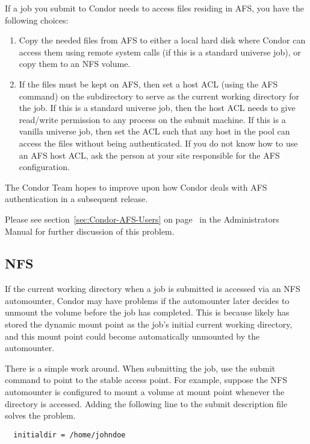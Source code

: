 If a job you submit to Condor needs to access files residing in AFS,
you have the following choices:
\begin{enumerate}
\item Copy the needed files from AFS to either a local hard disk where 
Condor can access them using remote system calls (if
this is a standard universe job), or copy them to an NFS volume.
\item If the files must be kept on AFS, then set a host ACL
(using the AFS  command) on the subdirectory to
serve as the current working directory for the job.
If this is a standard universe job, then the host ACL needs
to give read/write permission to any process on the submit machine.
If this is a vanilla universe job, then set the ACL such that any host 
in the pool can access the files without being authenticated.
If you do not know how to use an AFS host ACL, ask the person at your 
site responsible for the AFS configuration.
\end{enumerate}

The Condor Team hopes to improve upon how Condor deals with AFS 
authentication in a subsequent release.

Please see section~\ref{sec:Condor-AFS-Users} on
page~\pageref{sec:Condor-AFS-Users} in the Administrators Manual for
further discussion of this problem.

\subsection{NFS}

If the current working directory when a job is submitted
is accessed via an NFS automounter, Condor may have problems if the
automounter later decides to unmount the volume before the job has
completed.
This is because  likely has stored the
dynamic mount point as the job's initial current working directory, and
this mount point could become automatically unmounted by the
automounter.

There is a simple work around.
When submitting the job,
use the submit command  to point to
the stable access point.
For example,
suppose the NFS automounter is configured to mount a volume at mount point
whenever the directory  is accessed.
Adding the following line to the
submit description file solves the problem.
\begin{verbatim}
  initialdir = /home/johndoe
\end{verbatim}

